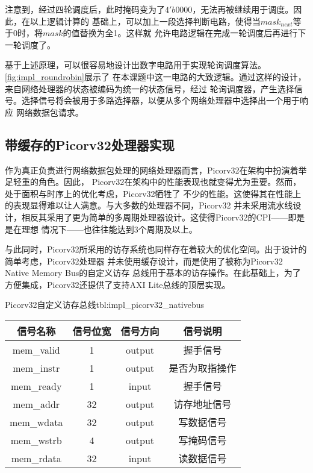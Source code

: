 注意到，经过四轮调度后，此时掩码变为了$4'b0000$，无法再被继续用于调度。因此，在以上逻辑计算的
基础上，可以加上一段选择判断电路，使得当$mask_{next}$等于0时，将$mask$的值替换为全1。这样就
允许电路逻辑在完成一轮调度后再进行下一轮调度了。


基于上述原理，可以很容易地设计出数字电路用于实现轮询调度算法。\autoref{fig:impl_roundrobin}展示了
在本课题中这一电路的大致逻辑。通过这样的设计，来自网络处理器的状态被编码为统一的状态信号，经过
轮询调度器，产生选择信号。选择信号将会被用于多路选择器，以便从多个网络处理器中选择出一个用于响应
网络数据包请求。

\subsection{带缓存的Picorv32处理器实现}

作为真正负责进行网络数据包处理的网络处理器而言，Picorv32在架构中扮演着举足轻重的角色。因此，
Picorv32在架构中的性能表现也就变得尤为重要。然而，处于面积与时序上的优化考虑，Picorv32牺牲了
不少的性能\cite{picorv32}。这使得其在性能上的表现显得难以让人满意。与大多数的处理器不同，Picorv32
并未采用流水线设计，相反其采用了更为简单的多周期处理器设计。这使得Picorv32的CPI——即是是在理想
情况下——也往往能达到3个周期及以上。

与此同时，Picorv32所采用的访存系统也同样存在着较大的优化空间。出于设计的简单考虑，Picorv32处理器
并未使用缓存设计，而是使用了被称为Picorv32 Native Memory Bus\cite{picorv32}的自定义访存
总线用于基本的访存操作。在此基础上，为了方便集成，Picorv32还提供了支持AXI Lite总线的顶层实现。

\begin{generaltab}{Picorv32自定义访存总线\cite{picorv32}}{tbl:impl_picorv32_nativebus}
  \begin{tabular}{cccc}
    \toprule
    信号名称 & 信号位宽 & 信号方向 & 信号说明 \\
    \midrule
    mem\_valid & 1 & output & 握手信号 \\
    mem\_instr & 1 & output & 是否为取指操作 \\
    mem\_ready & 1 & input & 握手信号 \\
    mem\_addr & 32 & output & 访存地址信号 \\
    mem\_wdata & 32 & output & 写数据信号 \\
    mem\_wstrb & 4 & output & 写掩码信号 \\
    mem\_rdata & 32 & input & 读数据信号 \\
    \bottomrule
  \end{tabular}
\end{generaltab}

